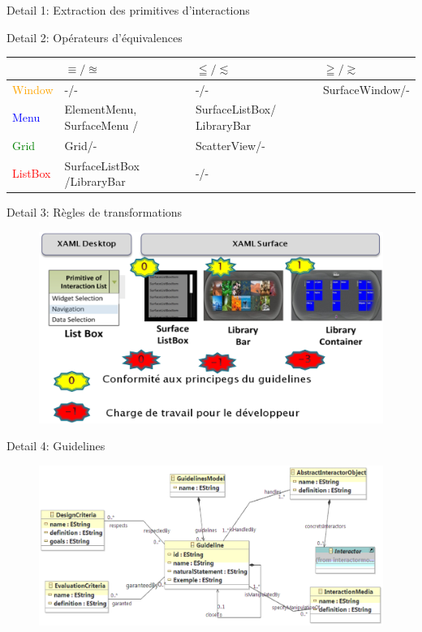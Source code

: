 \documentclass[11pt]{beamer}
\begin{document}
\begin{frame}{Detail 1: Extraction des primitives d'interactions}
\thispagestyle{empty}
\end{frame}
\begin{frame}{Detail 2: Opérateurs d'équivalences}
\thispagestyle{empty}
	\begin{table}[t]
		\begin{tabularx}{9cm}{|Y|Y|Y|Y|}
			\hline & $\equiv/\approxeq$ &  $  \leqq/ \lesssim $ & $ \geqq/\gtrsim$ \\
			\hline \textcolor{orange}{{\tiny Window }}&-/- &-/- & {\tiny SurfaceWindow}{\tiny /-} \\
			\hline \textcolor{blue}{{\tiny Menu}}
			& {\tiny ElementMenu, SurfaceMenu } /
			& {\tiny SurfaceListBox}{\tiny / LibraryBar}
			& \\
			\hline \textcolor{green}{{\tiny Grid}}
			&{\tiny  Grid}/-
			&{\tiny ScatterView}/- & \\
			\hline \textcolor{red}{{\tiny ListBox}}
			& {\tiny SurfaceListBox }/{\tiny LibraryBar}
			& -/-
			& \\
			\hline
		\end{tabularx}
	\end{table}

\end{frame}
\begin{frame}{Detail 3: Règles de transformations}
\thispagestyle{empty}
\begin{figure}
\centering
\includegraphics[scale=.4]{./img/selection1}
\end{figure}

\end{frame}
\begin{frame}{Detail 4: Guidelines}
\thispagestyle{empty}
\begin{figure}
\centering
\includegraphics[scale=.5]{./img/guidelinesmodeles}
\caption{}
\label{fig:guidelinesmodèles}
\end{figure}

\end{frame}
\end{document}

